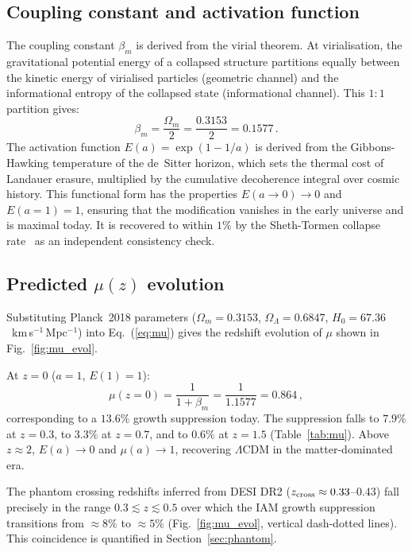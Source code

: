 \documentclass[12pt,a4paper]{article}
\newcommand{\lcdm}{$\Lambda$CDM}
\newcommand{\kms}{km\,s$^{-1}$\,Mpc$^{-1}$}
\begin{document}
\subsection{Coupling constant and activation function}
\label{sec:coupling}

The coupling constant $\beta_m$ is derived from the virial theorem.
At virialisation, the gravitational potential energy of a collapsed structure
partitions equally between the kinetic energy of virialised particles (geometric
channel) and the informational entropy of the collapsed state (informational
channel).
This $1:1$ partition gives:
\begin{equation}
\beta_m = \frac{\Omega_m}{2} = \frac{0.3153}{2} = 0.1577 \,.
\label{eq:betam}
\end{equation}
The activation function $E(a) = \exp(1 - 1/a)$ is derived from the
Gibbons-Hawking temperature of the de~Sitter horizon, which sets the
thermal cost of Landauer erasure, multiplied by the cumulative
decoherence integral over cosmic history.
This functional form has the properties $E(a \to 0) \to 0$ and
$E(a=1) = 1$, ensuring that the modification vanishes in the early
universe and is maximal today.
It is recovered to within $1\%$ by the Sheth-Tormen collapse
rate~\citep{ShethTormen1999} as an independent consistency check.

\subsection{Predicted $\mu(z)$ evolution}
\label{sec:mu_evolution}

Substituting Planck~2018 parameters ($\Omega_m = 0.3153$,
$\Omega_\Lambda = 0.6847$, $H_0 = 67.36$~\kms{}) into Eq.~(\ref{eq:mu})
gives the redshift evolution of $\mu$ shown in Fig.~\ref{fig:mu_evol}.

At $z = 0$ ($a = 1$, $E(1) = 1$):
\begin{equation}
\mu(z{=}0) = \frac{1}{1 + \beta_m} = \frac{1}{1.1577} = 0.864 \,,
\label{eq:mu0}
\end{equation}
corresponding to a $13.6\%$ growth suppression today.
The suppression falls to $7.9\%$ at $z = 0.3$, to $3.3\%$ at $z = 0.7$,
and to $0.6\%$ at $z = 1.5$ (Table~\ref{tab:mu}).
Above $z \approx 2$, $E(a) \to 0$ and $\mu(a) \to 1$, recovering \lcdm{}
in the matter-dominated era.

The phantom crossing redshifts inferred from DESI DR2 ($z_{\rm cross}
\approx 0.33$--$0.43$) fall precisely in the range $0.3 \lesssim z
\lesssim 0.5$ over which the IAM growth suppression transitions from
$\approx 8\%$ to $\approx 5\%$ (Fig.~\ref{fig:mu_evol}, vertical
dash-dotted lines).
This coincidence is quantified in Section~\ref{sec:phantom}.
\end{document}
